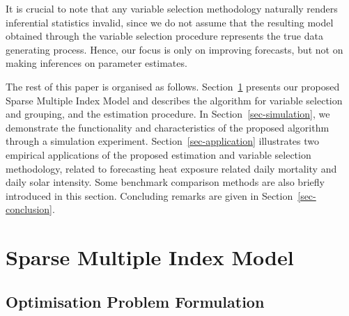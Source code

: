 \documentclass[
  11pt,
  a4paper,
]{article}
\begin{document}
It is crucial to note that any variable selection methodology naturally
renders inferential statistics invalid, since we do not assume that the
resulting model obtained through the variable selection procedure
represents the true data generating process. Hence, our focus is only on
improving forecasts, but not on making inferences on parameter
estimates.

The rest of this paper is organised as follows. Section~\ref{sec-SMI}
presents our proposed Sparse Multiple Index Model and describes the
algorithm for variable selection and grouping, and the estimation
procedure. In Section~\ref{sec-simulation}, we demonstrate the
functionality and characteristics of the proposed algorithm through a
simulation experiment. Section~\ref{sec-application} illustrates two
empirical applications of the proposed estimation and variable selection
methodology, related to forecasting heat exposure related daily
mortality and daily solar intensity. Some benchmark comparison methods
are also briefly introduced in this section. Concluding remarks are
given in Section~\ref{sec-conclusion}.

\section{Sparse Multiple Index Model}\label{sec-SMI}

\subsection{Optimisation Problem
Formulation}\label{optimisation-problem-formulation}
\end{document}
